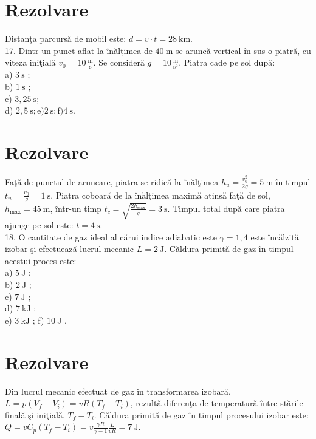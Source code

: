 \section*{Rezolvare}
Distanţa parcursă de mobil este: $d=v \cdot t=28 \mathrm{~km}$.\\
17. Dintr-un punct aflat la înălțimea de $40 \mathrm{~m}$ se aruncă vertical în sus o piatră, cu viteza iniţială $v_{0}=10 \frac{\mathrm{~m}}{\mathrm{~s}}$. Se consideră $g=10 \frac{\mathrm{~m}}{\mathrm{~s}^{2}}$. Piatra cade pe sol după:\\
a) $3 \mathrm{~s}$ ;\\
b) $1 \mathrm{~s}$ ;\\
c) $3,25 \mathrm{~s}$;\\
d) $2,5 \mathrm{~s} ; \mathrm{e}) 2 \mathrm{~s} ; \mathrm{f}) 4 \mathrm{~s}$.

\section*{Rezolvare}
Faţă de punctul de aruncare, piatra se ridică la înălţimea $h_{u}=\frac{v_{0}^{2}}{2 g}=5 \mathrm{~m}$ în timpul $t_{u}=\frac{v_{0}}{g}=1 \mathrm{~s}$. Piatra coboară de la înălţimea maximă atinsă faţă de sol, $h_{\max }=45 \mathrm{~m}$, într-un timp $t_{c}=\sqrt{\frac{2 h_{\max }}{g}}=3 \mathrm{~s}$. Timpul total după care piatra ajunge pe sol este: $t=4 \mathrm{~s}$.\\
18. O cantitate de gaz ideal al cărui indice adiabatic este $\gamma=1,4$ este încălzită izobar şi efectuează lucrul mecanic $L=2 \mathrm{~J}$. Căldura primită de gaz în timpul acestui proces este:\\
a) $5 \mathrm{~J}$ ;\\
b) $2 \mathrm{~J}$ ;\\
c) $7 \mathrm{~J}$ ;\\
d) $7 \mathrm{~kJ}$ ;\\
e) $3 \mathrm{~kJ}$ ; f) $10 \mathrm{~J}$ .

\section*{Rezolvare}
Din lucrul mecanic efectuat de gaz în transformarea izobară, $L=p\left(V_{f}-V_{i}\right)=v R\left(T_{f}-T_{i}\right)$, rezultă diferenţa de temperatură între stările finală şi iniţială, $T_{f}-T_{i}$. Căldura primită de gaz în timpul procesului izobar este: $Q=v C_{p}\left(T_{f}-T_{i}\right)=v \frac{\gamma R}{\gamma-1} \frac{L}{v R}=7 \mathrm{~J}$.

